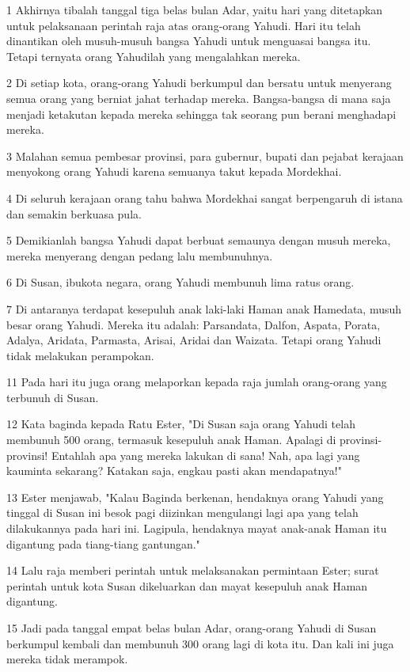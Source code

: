 \par 1 Akhirnya tibalah tanggal tiga belas bulan Adar, yaitu hari yang ditetapkan untuk pelaksanaan perintah raja atas orang-orang Yahudi. Hari itu telah dinantikan oleh musuh-musuh bangsa Yahudi untuk menguasai bangsa itu. Tetapi ternyata orang Yahudilah yang mengalahkan mereka.
\par 2 Di setiap kota, orang-orang Yahudi berkumpul dan bersatu untuk menyerang semua orang yang berniat jahat terhadap mereka. Bangsa-bangsa di mana saja menjadi ketakutan kepada mereka sehingga tak seorang pun berani menghadapi mereka.
\par 3 Malahan semua pembesar provinsi, para gubernur, bupati dan pejabat kerajaan menyokong orang Yahudi karena semuanya takut kepada Mordekhai.
\par 4 Di seluruh kerajaan orang tahu bahwa Mordekhai sangat berpengaruh di istana dan semakin berkuasa pula.
\par 5 Demikianlah bangsa Yahudi dapat berbuat semaunya dengan musuh mereka, mereka menyerang dengan pedang lalu membunuhnya.
\par 6 Di Susan, ibukota negara, orang Yahudi membunuh lima ratus orang.
\par 7 Di antaranya terdapat kesepuluh anak laki-laki Haman anak Hamedata, musuh besar orang Yahudi. Mereka itu adalah: Parsandata, Dalfon, Aspata, Porata, Adalya, Aridata, Parmasta, Arisai, Aridai dan Waizata. Tetapi orang Yahudi tidak melakukan perampokan.
\par 11 Pada hari itu juga orang melaporkan kepada raja jumlah orang-orang yang terbunuh di Susan.
\par 12 Kata baginda kepada Ratu Ester, "Di Susan saja orang Yahudi telah membunuh 500 orang, termasuk kesepuluh anak Haman. Apalagi di provinsi-provinsi! Entahlah apa yang mereka lakukan di sana! Nah, apa lagi yang kauminta sekarang? Katakan saja, engkau pasti akan mendapatnya!"
\par 13 Ester menjawab, "Kalau Baginda berkenan, hendaknya orang Yahudi yang tinggal di Susan ini besok pagi diizinkan mengulangi lagi apa yang telah dilakukannya pada hari ini. Lagipula, hendaknya mayat anak-anak Haman itu digantung pada tiang-tiang gantungan."
\par 14 Lalu raja memberi perintah untuk melaksanakan permintaan Ester; surat perintah untuk kota Susan dikeluarkan dan mayat kesepuluh anak Haman digantung.
\par 15 Jadi pada tanggal empat belas bulan Adar, orang-orang Yahudi di Susan berkumpul kembali dan membunuh 300 orang lagi di kota itu. Dan kali ini juga mereka tidak merampok.
